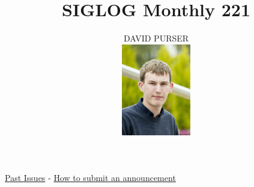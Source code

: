 \documentclass[prodmode,acmtecs]{acmsmall} %
\newcounter{colstart}
\begin{document}
\setcounter{colstart}{\thepage}

\title{\huge\sc SIGLOG Monthly 221}
\author{DAVID PURSER
\vspace*{-2.6cm}\begin{flushright}\includegraphics[width=30mm]{dp}\end{flushright}
}

\maketitlee

\href{https://lics.siglog.org/newsletters/}{Past Issues}
 - 
\href{https://lics.siglog.org/newsletters/inst.html}{How to submit an announcement}
\end{document}
